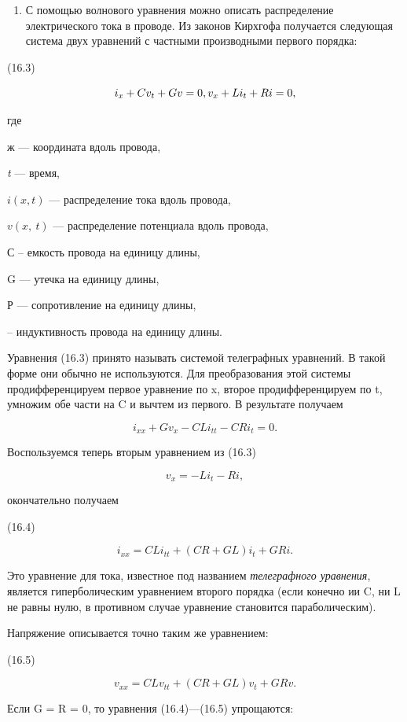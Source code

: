 \documentclass[
  ukrainian,
]{article}
\providecommand{\tightlist}{%
  \setlength{\itemsep}{0pt}\setlength{\parskip}{0pt}}
\begin{document}
\begin{enumerate}
\def\labelenumi{\arabic{enumi}.}
\setcounter{enumi}{3}
\tightlist
\item
  С помощью волнового уравнения можно описать распределение
  электрического тока в проводе. Из законов Кирхгофа получается
  следующая система двух уравнений с частными производными первого
  порядка:
\end{enumerate}

(16.3)

\[
i_x + Cv_t + Gv = 0, \\ v_x + Li_t + Ri = 0,
\]

где

ж --- координата вдоль провода,

\emph{t} --- время,

\(i(x, t)\) --- распределение тока вдоль провода,

\(v\left(x,\ t\right)\) --- распределение потенциала вдоль провода,

С -- емкость провода на единицу длины,

G --- утечка на единицу длины,

Р --- сопротивление на единицу длины,

-- индуктивность провода на единицу длины.

Уравнения (16.3) принято называть системой телеграфных уравнений. В
такой форме они обычно не используются. Для преобразования этой системы
продифференцируем первое уравнение по x, второе продифференцируем по t,
умножим обе части на C и вычтем из первого. В результате получаем

\[
i_{xx} + Gv_x - CLi_{tt} - CRi_t = 0.
\]

Воспользуемся теперь вторым уравнением из (16.3)

\[
v_{x} = -Li_{t} - Ri,
\]

окончательно получаем

(16.4)

\[
i_{xx} = CLi_{tt} + (CR + GL)i_t + GRi.
\]

Это уравнение для тока, известное под названием \emph{телеграфного
уравнения}, является гиперболическим уравнением второго порядка (если
конечно ии C, ни L не равны нулю, в противном случае уравнение
становится параболическим).

Напряжение описывается точно таким же уравнением:

(16.5)

\[
v_{xx} = CLv_{tt} + (CR + GL)v_t + GRv.
\]

Если G = R = 0, то уравнения (16.4)---(16.5) упрощаются:
\end{document}
